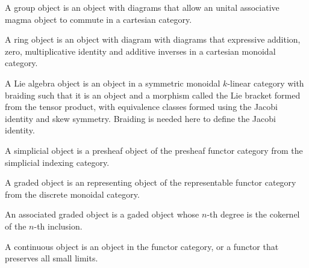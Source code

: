 \begin{definition}
    \label{definition-group-object}
    A group object is an object with diagrams that allow an unital associative magma object to commute in a cartesian category.
\end{definition}

\begin{definition}
    \label{definition-ring-object}
    A ring object is an object with diagram with diagrams that expressive addition, zero, multiplicative identity and additive inverses in a cartesian monoidal category.
\end{definition}

\begin{definition}
    \label{definition-lie-algebra-object}
    A Lie algebra object is an object in a symmetric monoidal $k$-linear category with braiding such that it is an object and a morphism called the Lie bracket formed from the tensor product, with equivalence classes formed using the Jacobi identity and skew symmetry. Braiding is needed here to define the Jacobi identity.
\end{definition}

\begin{definition}
    \label{definition-simplicial-object}
    A simplicial object is a presheaf object of the presheaf functor category from the simplicial indexing category.
\end{definition}

\begin{definition}
    \label{definition-graded-object-functor}
    A graded object is an representing object of the representable functor category from the discrete monoidal category.
\end{definition}

\begin{definition}
    \label{definition-associated-graded-object-functor}
    An associated graded object is a gaded object whose $n$-th degree is the cokernel of the $n$-th inclusion.
\end{definition}

\begin{definition}
    \label{definition-continuous-object}
    A continuous object is an object in the functor category, or a functor that preserves all small limits.
\end{definition}

